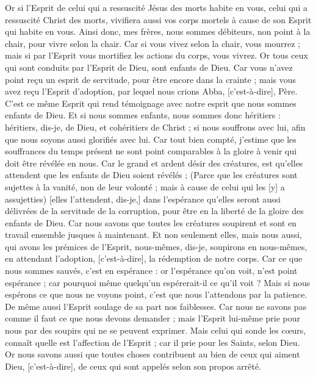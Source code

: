 \begin{multicols}{2}
Or si l'Esprit de celui qui a ressuscité Jésus des morts habite en vous, celui qui a ressuscité Christ des morts, vivifiera aussi vos corps mortels à cause de son Esprit qui habite en vous.
Ainsi donc, mes frères, nous sommes débiteurs, non point à la chair, pour vivre selon la chair.
Car si vous vivez selon la chair, vous mourrez ; mais si par l'Esprit vous mortifiez les actions du corps, vous vivrez.
Or tous ceux qui sont conduits par l'Esprit de Dieu, sont enfants de Dieu.
Car vous n'avez point reçu un esprit de servitude, pour être encore dans la crainte ; mais vous avez reçu l'Esprit d'adoption, par lequel nous crions Abba, [c'est-à-dire], Père.
C'est ce même Esprit qui rend témoignage avec notre esprit que nous sommes enfants de Dieu.
Et si nous sommes enfants, nous sommes donc héritiers : héritiers, dis-je, de Dieu, et cohéritiers de Christ ; si nous souffrons avec lui, afin que nous soyons aussi glorifiés avec lui.
Car tout bien compté, j'estime que les souffrances du temps présent ne sont point comparables à la gloire à venir qui doit être révélée en nous.
Car le grand et ardent désir des créatures, est qu'elles attendent que les enfants de Dieu soient révélés ;
(Parce que les créatures sont sujettes à la vanité, non de leur volonté ; mais à cause de celui qui les [y] a assujetties) [elles l'attendent, dis-je,] dans l'espérance qu'elles seront aussi délivrées de la servitude de la corruption, pour être en la liberté de la gloire des enfants de Dieu.
Car nous savons que toutes les créatures soupirent et sont en travail ensemble jusques à maintenant.
Et non seulement elles, mais nous aussi, qui avons les prémices de l'Esprit, nous-mêmes, dis-je, soupirons en nous-mêmes, en attendant l'adoption, [c'est-à-dire], la rédemption de notre corps.
Car ce que nous sommes sauvés, c'est en espérance : or l'espérance qu'on voit, n'est point espérance ; car pourquoi même quelqu'un espérerait-il ce qu'il voit ?
Mais si nous espérons ce que nous ne voyons point, c'est que nous l'attendons par la patience.
De même aussi l'Esprit soulage de sa part nos faiblesses. Car nous ne savons pas comme il faut ce que nous devons demander ; mais l'Esprit lui-même prie pour nous par des soupirs qui ne se peuvent exprimer.
Mais celui qui sonde les cœurs, connaît quelle est l'affection de l'Esprit ; car il prie pour les Saints, selon Dieu.
Or nous savons aussi que toutes choses contribuent au bien de ceux qui aiment Dieu, [c'est-à-dire], de ceux qui sont appelés selon son propos arrêté.

\end{multicols}
